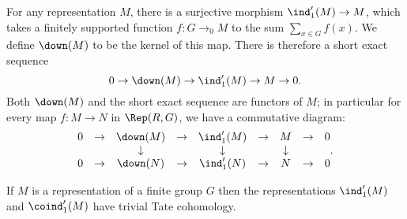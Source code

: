 
\begin{definition} \label{def:down}
	For any representation $M$, there is a surjective morphism $\ind_1'(M) \to M$,
	which takes a finitely supported function $f : G \to_0 M$ to the sum $\sum_{x \in G} f (x)$.
	We define $\down(M)$ to be the kernel of this map.
	There is therefore a short exact sequence
	\[
		0 \to \down(M) \to \ind_1'(M) \to M \to 0.
	\]
	Both $\down(M)$ and the short exact sequence are functors of $M$; in particular for
	every map $f : M \to N$ in $\Rep(R,G)$, we have a commutative diagram:
	\[
		\begin{matrix}
			0 & \to & \down(M) &\to &\ind_1'(M)& \to& M & \to & 0 \\
			&&\downarrow && \downarrow && \downarrow \\
			0 & \to & \down(N) &\to &\ind_1'(N)& \to& N & \to & 0
		\end{matrix} .
	\]
\end{definition}



\begin{lemma} \label{lem:induced' trivial Tate}
	\leanok
	If $M$ is a representation of a finite group $G$ then the representations
	$\ind_1'(M)$ and $\coind_1'(M)$ have trivial Tate cohomology.
\end{lemma}

